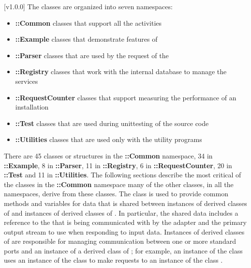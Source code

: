 [v1.0.0]
The \mplusm{} classes are organized into seven namespaces:
\begin{itemize}
\item\textbf{\mplusm{}::Common} classes that support all the \mplusm{} activities
\item\exSp\textbf{\mplusm{}::Example} classes that demonstrate features of \mplusm{}
\item\exSp\textbf{\mplusm{}::Parser} classes that are used by the
 request of the
\item\exSp\textbf{\mplusm{}::Registry} classes that work with the internal database to
manage the \mplusm{} services
\item\exSp\textbf{\mplusm{}::RequestCounter} classes that support measuring the
performance of an \mplusm{} installation
\item\exSp\textbf{\mplusm{}::Test} classes that are used during unit\longDash{}testing of
the \mplusm{} source code
\item\exSp\textbf{\mplusm{}::Utilities} classes that are used only with the \mplusm{}
utility programs
\end{itemize}
There are 45 classes or structures in the \textbf{\mplusm{}::Common} namespace, 34 in
\textbf{\mplusm{}::Example}, 8 in \textbf{\mplusm{}::Parser}, 11 in
\textbf{\mplusm{}::Registry}, 6 in \textbf{\mplusm{}::RequestCounter}, 20 in
\textbf{\mplusm{}::Test} and 11 in \textbf{\mplusm{}::Utilities}.
The following sections describe the most critical of the classes in the
\textbf{\mplusm{}::Common} namespace \longDash{} many of the other classes, in all the
namespaces, derive from these classes. 
The class  is used to provide common methods and
variables for data that is shared between instances of derived classes of
 and instances of derived classes of
.
In particular, the shared data includes a reference to the 
that is being communicated with by the adapter and the primary output stream to use when
responding to input data.
Instances of derived classes of  are responsible
for managing \mplusm{} communication between one or more standard \yarp{} ports and an
instance of a derived class of ; for example, an instance
of the class  uses an instance of the class
 to make requests to an instance of the class
.\\

